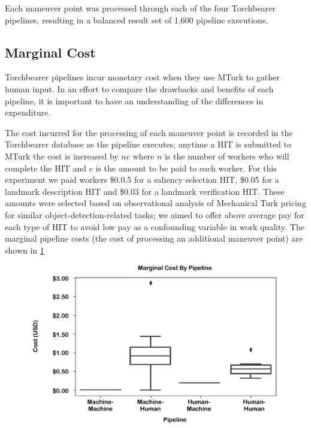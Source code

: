 Each maneuver point was processed through each of the four Torchbearer pipelines, resulting in a balanced result set of 1,600 pipeline executions.

\subsection{Marginal Cost}

Torchbearer pipelines incur monetary cost when they use MTurk to gather human input. In an effort to compare the drawbacks and benefits of each pipeline, it is important to have an understanding of the differences in expenditure.

The cost incurred for the processing of each maneuver point is recorded in the Torchbearer database as the pipeline executes; anytime a HIT is submitted to MTurk the cost is increased by $nc$ where $n$ is the number of workers who will complete the HIT and $c$ is the amount to be paid to each worker. For this experiment we paid workers \$0.0.5 for a saliency selection HIT, \$0.05 for a landmark description HIT and \$0.03 for a landmark verification HIT. These amounts were selected based on observational analysis of Mechanical Turk pricing for similar object-detection-related tasks; we aimed to offer above average pay for each type of HIT to avoid low pay as a confounding variable in work quality. The marginal pipeline costs (the cost of processing an additional maneuver point) are shown in \ref{fig:plot:cost}

\begin{figure}[htbp]
  \centering
  \includegraphics[width=\textwidth]{images/plot_cost.pdf}
  \caption{}
  \label{fig:plot:cost}
\end{figure}


